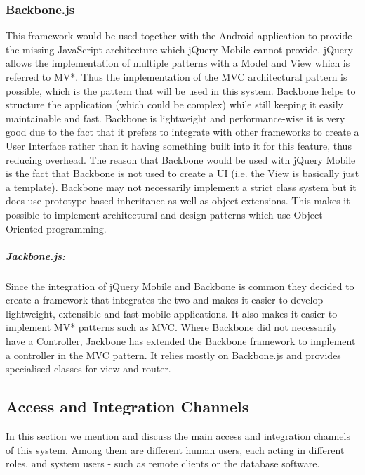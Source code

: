 \documentclass[a4paper,12pt]{article}
\begin{document}
\subsubsection{Backbone.js}
This framework would be used together with the Android application to provide the missing JavaScript architecture which jQuery Mobile cannot provide. jQuery allows the implementation of multiple patterns with a Model and View which is referred to MV*. Thus the implementation of the MVC architectural pattern is possible, which is the pattern that will be used in this system. Backbone helps to structure the application (which could be complex) while still keeping it easily maintainable and fast. Backbone is lightweight and performance-wise it is very good due to the fact that it prefers to integrate with other frameworks to create a User Interface rather than it having something built into it for this feature, thus reducing overhead. The reason that Backbone would be used with jQuery Mobile is the fact that Backbone is not used to create a UI (i.e. the View is basically just a template). Backbone may not necessarily implement a strict class system but it does use prototype-based inheritance as well as object extensions. This makes it possible to implement architectural and design patterns which use Object-Oriented programming.

\subparagraph{Jackbone.js:}
Since the integration of jQuery Mobile and Backbone is common they decided to create a framework that integrates the two and makes it easier to develop lightweight, extensible and fast mobile applications. It also makes it easier to implement MV* patterns such as MVC. Where Backbone did not necessarily have a Controller, Jackbone has extended the Backbone framework to implement a controller in the MVC pattern. It relies mostly on Backbone.js and provides specialised classes for view and router.

\subsection{Access and Integration Channels}
In this section we mention and discuss the main access and integration channels of this system. Among them are different human users, each acting in different roles, and system users - such as remote clients or the database software.
\end{document}
